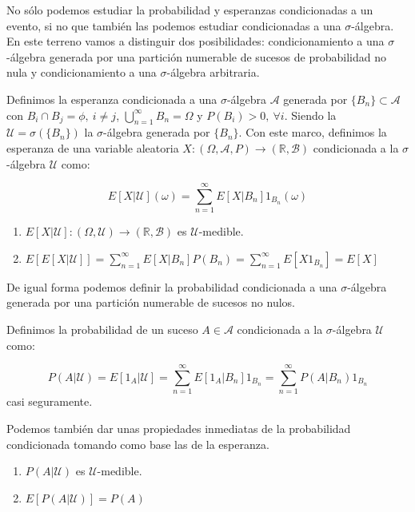 No sólo podemos estudiar la probabilidad y esperanzas condicionadas a un evento, si no que también las podemos estudiar condicionadas a una $\sigma$-álgebra. En este terreno vamos a distinguir dos posibilidades: condicionamiento a una $\sigma$-álgebra generada por una partición numerable de sucesos de probabilidad no nula y condicionamiento a una $\sigma$-álgebra arbitraria.

\begin{definicion}
	Definimos la esperanza condicionada a una $\sigma$-álgebra $\mathcal{A}$ generada por $\{ B_n \}\subset \mathcal{A}$ con $B_i \cap B_j = \phi , \ i\neq j$, $\bigcup_{n=1}^{\infty} B_n = \Omega$ y $P(B_i)>0 , \ \forall i$. Siendo la $\mathcal{U} = \sigma (\{ B_n \})$ la $\sigma$-álgebra generada por $\{ B_n \}$. Con este marco, definimos la esperanza de una variable aleatoria $X: (\Omega , \mathcal{A}, P) \rightarrow (\mathbb{R}, \mathcal{B})$ condicionada a la $\sigma$-álgebra $\mathcal{U}$ como:
	
	$$E[X | \mathcal{U}](\omega) = \sum_{n=1}^{\infty} E[X | B_n]1_{B_n}(\omega)$$
\end{definicion}

\begin{propiedades}
	\begin{enumerate}
		\item $E[X | \mathcal{U}]: (\Omega , \mathcal{U}) \rightarrow (\mathbb{R}, \mathcal{B})$ es $\mathcal{U}$-medible.
		\item $E[E[X | \mathcal{U}]] = \sum_{n=1}^{\infty}E[X | B_n]P(B_n) = \sum_{n=1}^{\infty}E[X1_{B_n}] = E[X]$
	\end{enumerate}
\end{propiedades}

De igual forma podemos definir la probabilidad condicionada a una $\sigma$-álgebra generada por una partición numerable de sucesos no nulos.

\begin{definicion}
	Definimos la probabilidad de un suceso $A\in \mathcal{A}$ condicionada a la $\sigma$-álgebra $\mathcal{U}$ como:
	
	$$P(A | \mathcal{U}) = E[1_A | \mathcal{U}] = \sum_{n=1}^{\infty}E[1_A | B_n]1_{B_n} = \sum_{n=1}^{\infty}P(A | B_n)1_{B_n}$$ casi seguramente.
\end{definicion}

Podemos también dar unas propiedades inmediatas de la probabilidad condicionada tomando como base las de la esperanza.

\begin{propiedades}
	\begin{enumerate}
		\item $P(A | \mathcal{U})$ es $\mathcal{U}$-medible.
		\item $E[P(A | \mathcal{U})] = P(A)$
	\end{enumerate}
\end{propiedades}

